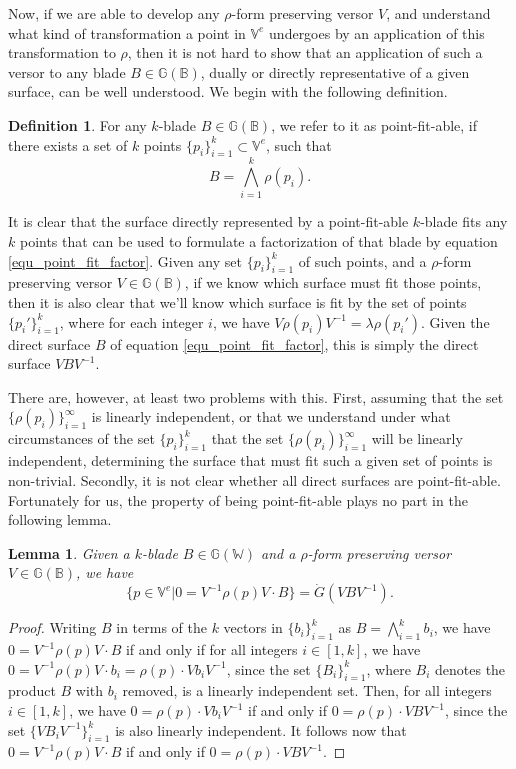 \documentclass{birkjour}
\newtheorem{lem}[thm]{Lemma}
\theoremstyle{definition}
\newtheorem{defn}[thm]{Definition}
\theoremstyle{remark}
\numberwithin{equation}{section}
\newcommand{\G}{\mathbb{G}}
\newcommand{\V}{\mathbb{V}}
\newcommand{\W}{\mathbb{W}}
\newcommand{\B}{\mathbb{B}}
\newcommand{\Gi}{\dot{G}}
\begin{document}
Now, if we are able to develop any $\rho$-form preserving versor $V$,
and understand what kind of transformation a point in $\V^e$ undergoes by an application
of this transformation to $\rho$, then it is not hard to show that an application of
such a versor to any blade $B\in\G(\B)$, dually or directly representative of a given surface,
can be well understood.
We begin with the following definition.
\begin{defn}
For any $k$-blade $B\in\G(\B)$, we refer to it as point-fit-able, if there
exists a set of $k$ points $\{p_i\}_{i=1}^k\subset\V^e$, such that
\begin{equation}\label{equ_point_fit_factor}
B = \bigwedge_{i=1}^k\rho(p_i).
\end{equation}
\end{defn}
It is clear that the surface directly represented by a point-fit-able $k$-blade fits
any $k$ points that can be used to formulate a factorization of that blade
by equation \eqref{equ_point_fit_factor}.  Given any set $\{p_i\}_{i=1}^k$ of such points,
and a $\rho$-form preserving versor $V\in\G(\B)$,
if we know which surface must fit those points, then it is also clear that
we'll know which surface is fit by the set of points $\{p_i'\}_{i=1}^k$,
where for each integer $i$, we have $V\rho(p_i)V^{-1}=\lambda\rho(p_i')$.
Given the direct surface $B$ of equation \eqref{equ_point_fit_factor}, this is simply the
direct surface $VBV^{-1}$.

There are, however, at least two problems with this.  First, assuming that
the set $\{\rho(p_i)\}_{i=1}^\infty$ is linearly independent, or that
we understand under what circumstances of the set $\{p_i\}_{i=1}^k$
that the set $\{\rho(p_i)\}_{i=1}^\infty$ will be linearly independent, determining the
surface that must fit such a given set of points is non-trivial.
Secondly, it is not clear whether all direct surfaces are point-fit-able.
Fortunately for us, the property of being point-fit-able plays no
part in the following lemma.

\begin{lem}\label{lem_xform_dual_geo}
Given a $k$-blade $B\in\G(\W)$ and a $\rho$-form preserving versor $V\in\G(\B)$,
we have
\begin{equation}
\{p\in\V^e|0=V^{-1}\rho(p)V\cdot B\}=\Gi(VBV^{-1}).
\end{equation}
\end{lem}
\begin{proof}
Writing $B$ in terms of the $k$ vectors in $\{b_i\}_{i=1}^k$ as $B=\bigwedge_{i=1}^k b_i$,
we have $0=V^{-1}\rho(p)V\cdot B$ if and only if for all integers $i\in[1,k]$,
we have $0=V^{-1}\rho(p)V\cdot b_i=\rho(p)\cdot Vb_iV^{-1}$, since the
set $\{B_i\}_{i=1}^k$, where $B_i$ denotes the product $B$ with $b_i$ removed,
is a linearly independent set.  Then, for all integers $i\in[1,k]$, we have $0=\rho(p)\cdot Vb_iV^{-1}$
if and only if $0=\rho(p)\cdot VBV^{-1}$, since
the set $\{VB_iV^{-1}\}_{i=1}^k$ is also linearly independent.
It follows now that $0=V^{-1}\rho(p)V\cdot B$ if and only if $0=\rho(p)\cdot VBV^{-1}$.
\end{proof}
\end{document}
